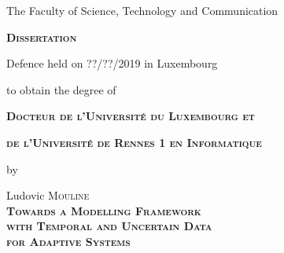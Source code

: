 \documentclass[12pt, twoside]{book}
\begin{document}
\begin{center}         
         \vspace{0.6cm}\noindent
         
         The Faculty of Science, Technology and Communication
         
         \vspace{1cm}\noindent
         {\LARGE \textbf{\textsc{Dissertation}}}
         
         \vspace{0.8cm}
         \noindent
         Defence held on ??/??/2019 in Luxembourg
         
         \vspace{0.5cm}\noindent
         to obtain the degree of
         
         \vspace{1.2cm}\noindent
         {\Large \textbf{\textsc{Docteur de l'Université du Luxembourg et}}}

         \vspace{0.2cm}\noindent
         {\Large \textbf{\textsc{de l'Université de Rennes 1 en Informatique}}}

         \vspace{0.5cm}\noindent
         {\Large by}

         \vspace{0.5cm}\noindent
         {\Large Ludovic \textsc{Mouline}}\\

         \vspace{1cm}\noindent
         {\LARGE \textbf{\textsc{Towards a Modelling Framework}}}\\[0.4cm] 
         {\LARGE \textbf{\textsc{ with Temporal and Uncertain Data}}}\\[0.4cm]
                  {\LARGE \textbf{\textsc{for Adaptive Systems}}}\\[0.4cm]
\end{center}

\vspace{0.4cm}
\end{document}
